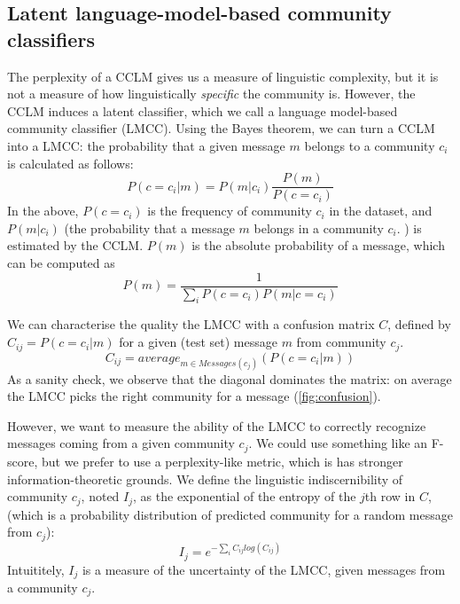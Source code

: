 \documentclass[11pt,a4paper]{article}
\newcommand\Ind{I}
\begin{document}
\begin{table}
  \centering
  
  \caption{Pearson's r between the pairwise similarity of community vectors
  in the CCLM models and the membership-based embedding of \citet{Kumar2018}.
  ($p<0.001$ for all models).
  }
  \label{tab:pairwise-comm-sim}
\end{table}

\subsection{Latent language-model-based community classifiers}

The perplexity of a CCLM gives us a measure of linguistic complexity,
but it is not a measure of how linguistically \emph{specific} the
community is. However, the CCLM induces a latent classifier,
which we call a language model-based community classifier
(LMCC). Using the Bayes theorem, we can turn a
CCLM into a LMCC: the probability that a given message $m$
belongs to a community $c_i$ is calculated as follows:
\[P(c=c_i | m) = P(m | c_i)\frac {P(m)} {P(c=c_i)}\]
In the above,
$P(c=c_i)$ is the frequency of community $c_i$ in the dataset, and
$P(m | c_i)$ (the probability that a message $m$
belongs in a community $c_i$. ) is estimated by the CCLM. $P(m)$ is the absolute
probability of a message, which can be computed as
\[P(m) = \frac 1 {\sum_i P(c=c_i) P(m|c=c_i ) }\]

We can characterise the quality the LMCC with a confusion matrix
$C$, defined by $C_{ij} = P(c=c_i | m)$ for a given (test set) message $m$ 
from community $c_j$.
\[C_{ij} = average_{m \in Messages(c_j)}(P(c=c_i | m))\]
As a sanity check, we observe that the diagonal dominates the matrix: on average the LMCC picks the right community for a message (\cref{fig:confusion}).

\begin{figure*}
\caption{LMCC confusion matrices for the best LSTM (left, $c=1$) and transformer (right, $c=3$) models.}
\label{fig:confusion}
\end{figure*}

However, we want to measure the ability of the LMCC to correctly
recognize messages coming from a given community $c_j$. We could use
something like an F-score, but we prefer to use a perplexity-like metric,
which is has stronger information-theoretic grounds.
We define the linguistic indiscernibility of community $c_j$, noted $\Ind_j$, 
as the exponential of the entropy of the $j$th row in \(C\),
(which is a probability distribution
of predicted community for a random message from $c_j$):
\[\Ind_j = e^{-\sum_i C_{ij} log(C_{ij})}\]
Intuititely, $\Ind_j$ is a measure of the uncertainty of the LMCC,
given messages from a community $c_j$.
\end{document}
